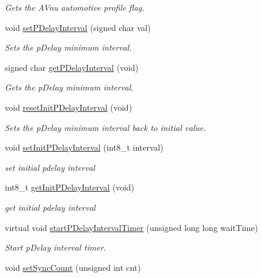 \begin{DoxyCompactItemize}
\begin{DoxyCompactList}\small\item\em Gets the A\+Vnu automotive profile flag. \end{DoxyCompactList}\item 
void \hyperlink{class_common_port_aeccea93c15d4e8ce00dd87a20227a8bb}{set\+P\+Delay\+Interval} (signed char val)
\begin{DoxyCompactList}\small\item\em Sets the p\+Delay minimum interval. \end{DoxyCompactList}\item 
signed char \hyperlink{class_common_port_a6b594b958b0887ec332bfb61bc5981c4}{get\+P\+Delay\+Interval} (void)
\begin{DoxyCompactList}\small\item\em Gets the p\+Delay minimum interval. \end{DoxyCompactList}\item 
void \hyperlink{class_common_port_a581ecd601f511bc0e7378f12ff690c63}{reset\+Init\+P\+Delay\+Interval} (void)
\begin{DoxyCompactList}\small\item\em Sets the p\+Delay minimum interval back to initial value. \end{DoxyCompactList}\item 
void \hyperlink{class_common_port_ae85afbc79e2236958fd975d9bd55d61e}{set\+Init\+P\+Delay\+Interval} (int8\+\_\+t interval)
\begin{DoxyCompactList}\small\item\em set initial pdelay interval \end{DoxyCompactList}\item 
int8\+\_\+t \hyperlink{class_common_port_ad2164f9dd75bd80b8e8dd7456f6c5dc3}{get\+Init\+P\+Delay\+Interval} (void)
\begin{DoxyCompactList}\small\item\em get initial pdelay interval \end{DoxyCompactList}\item 
virtual void \hyperlink{class_common_port_a6fb0ad2d83f335ad766394adfd52e930}{start\+P\+Delay\+Interval\+Timer} (unsigned long long wait\+Time)
\begin{DoxyCompactList}\small\item\em Start p\+Delay interval timer. \end{DoxyCompactList}\item 
void \hyperlink{class_common_port_af6ea2ac59598ee23d3886aa4a98ad4ab}{set\+Sync\+Count} (unsigned int cnt)

\end{DoxyCompactItemize}
